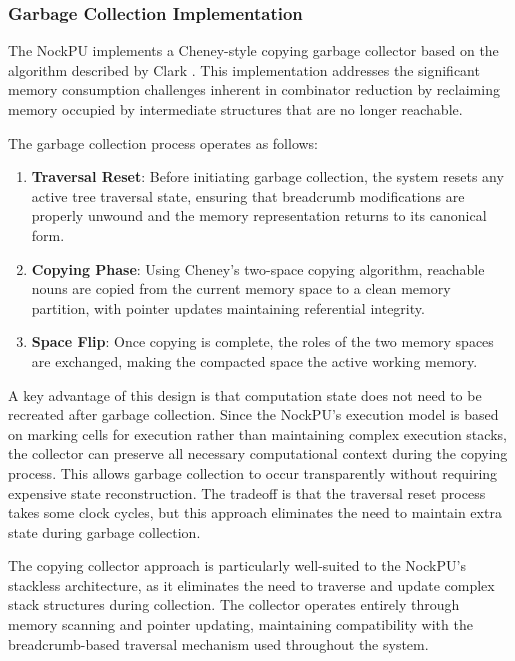 \documentclass[twoside]{article}
\begin{document}
\subsubsection{Garbage Collection Implementation}

The NockPU implements a Cheney-style copying garbage collector based on the algorithm described by Clark \citep{Clark1976}. This implementation addresses the significant memory consumption challenges inherent in combinator reduction by reclaiming memory occupied by intermediate structures that are no longer reachable.

The garbage collection process operates as follows:

\begin{enumerate}
  \item \textbf{Traversal Reset}: Before initiating garbage collection, the system resets any active tree traversal state, ensuring that breadcrumb modifications are properly unwound and the memory representation returns to its canonical form.
  \item \textbf{Copying Phase}: Using Cheney's two-space copying algorithm, reachable nouns are copied from the current memory space to a clean memory partition, with pointer updates maintaining referential integrity.
  \item \textbf{Space Flip}: Once copying is complete, the roles of the two memory spaces are exchanged, making the compacted space the active working memory.
\end{enumerate}

\noindent
A key advantage of this design is that computation state does not need to be recreated after garbage collection. Since the NockPU's execution model is based on marking cells for execution rather than maintaining complex execution stacks, the collector can preserve all necessary computational context during the copying process. This allows garbage collection to occur transparently without requiring expensive state reconstruction. The tradeoff is that the traversal reset process takes some clock cycles, but this approach eliminates the need to maintain extra state during garbage collection.

The copying collector approach is particularly well-suited to the NockPU's stackless architecture, as it eliminates the need to traverse and update complex stack structures during collection. The collector operates entirely through memory scanning and pointer updating, maintaining compatibility with the breadcrumb-based traversal mechanism used throughout the system.
\end{document}
